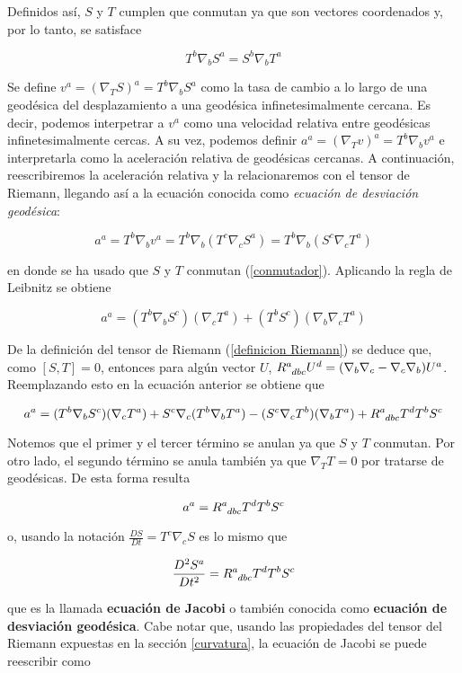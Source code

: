  Definidos así, $S$ y $T$ cumplen que conmutan ya que son vectores coordenados y, por lo tanto, se satisface

\begin{equation}\label{conmutador}
     T^b\nabla_bS^a=S^b\nabla_bT^a 
\end{equation}
 

Se define $v^a=(\nabla_TS)^a=T^b\nabla_bS^a$ como la tasa de cambio a lo largo de una geodésica del desplazamiento a una geodésica infinetesimalmente cercana. Es decir, podemos interpetrar a $v^a$ como una velocidad relativa entre geodésicas infinetesimalmente cercas. A su vez, podemos definir $a^a=(\nabla_Tv)^a=T^b\nabla_bv^a$ e interpretarla como la aceleración relativa de geodésicas cercanas. A continuación, reescribiremos la aceleración relativa y la relacionaremos con el tensor de Riemann, llegando así a la ecuación conocida como \textit{ecuación de desviación geodésica}:

$$
a^a=T^b\nabla_bv^a=T^b\nabla_b(T^c\nabla_cS^a)=T^b\nabla_b(S^c\nabla_cT^a)
$$

en donde se ha usado que $S$ y $T$ conmutan (\ref{conmutador}). Aplicando la regla de Leibnitz se obtiene

$$
a^a=(T^b\nabla_bS^c)(\nabla_cT^a)+(T^bS^c)(\nabla_b\nabla_cT^a)
$$

De la definición del tensor de Riemann (\ref{definicion Riemann}) se deduce que, como $[S,T]=0$, entonces para algún vector $U$, $\tensor{R}{^a_{dbc}}U^d=(\nabla_b\nabla_c-\nabla_c\nabla_b)U^a$. Reemplazando esto en la ecuación anterior se obtiene que

$$
a^a=(T^b\nabla_bS^c)(\nabla_cT^a)+S^c\nabla_c(T^b\nabla_bT^a)-(S^c\nabla_cT^b)(\nabla_bT^a)+\tensor{R}{^a_{dbc}}T^dT^bS^c
$$

Notemos que el primer y el tercer término se anulan ya que $S$ y $T$ conmutan. Por otro lado, el segundo término se anula también ya que $\nabla_TT=0$ por tratarse de geodésicas. De esta forma resulta

$$
a^a=\tensor{R}{^a_{dbc}}T^dT^bS^c
$$

o, usando la notación $\frac{DS}{Dt}=T^c\nabla_cS$ es lo mismo que

\begin{equation}\label{Jacobi}
     \frac{D^2S^a}{Dt^2}=\tensor{R}{^a_{dbc}}T^dT^bS^c
\end{equation}

que es la llamada \textbf{ecuación de Jacobi} o también conocida como \textbf{ecuación de desviación geodésica}. Cabe notar que, usando las propiedades del tensor del Riemann expuestas en la sección \ref{curvatura}, la ecuación de Jacobi se puede reescribir como

